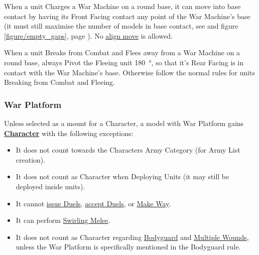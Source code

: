 When a unit Charges a War Machine on a round base, it can move into base contact by having its Front Facing contact any point of the War Machine's base (it must still maximise the number of models in base contact, see  and figure \ref{figure/empty_gaps}, page \pageref{figure/empty_gaps}). No \hyperref[aligning_units]{align move} is allowed.

When a unit Breaks from Combat and Flees away from a War Machine on a round base, always Pivot the Fleeing unit \SI{180}{\degree}, so that it's Rear Facing is in contact with the War Machine's base. Otherwise follow the normal rules for units Breaking from Combat and Fleeing.

\subsubsection{War Platform}
\idx[main=y]{\warplatform}\label{war_platform}

Unless selected as a mount for a Character, a model with War Platform gains \hyperref[characters]{\textbf{Character}} with the following exceptions:

\begin{itemize}
	\item It does not count towards the Characters Army Category (for Army List creation).
	\item It does not count as Character when Deploying Units (it may still be deployed inside units).
	\item It cannot \hyperref[issuing_a_duel]{issue Duels}, \hyperref[accepting_and_refusing_a_duel]{accept Duels}, or \hyperref[make_way]{Make Way}.
	\item It can perform \hyperref[swirling_melee]{Swirling Melee}.
	\item It does not count as Character regarding \hyperref[bodyguard]{Bodyguard} and \hyperref[multiple_wounds]{Multiple Wounds}, unless the War Platform is specifically mentioned in the Bodyguard rule.
\end{itemize}

